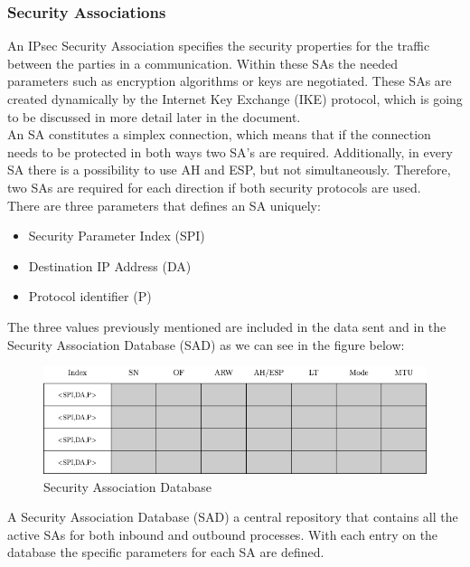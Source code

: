 \documentclass[11pt]{book}
\begin{document}
\subsubsection{ Security Associations}
An IPsec Security Association specifies the security properties for the traffic between the parties in a communication. Within these SAs the needed parameters such as encryption algorithms or keys are negotiated. These SAs are created dynamically by the Internet Key Exchange (IKE) protocol, which is going to be discussed in more detail later in the document.\\
An SA constitutes a simplex connection, which means that if the connection needs to be protected in both ways two SA's are required. Additionally, in every SA there is a possibility to use AH and ESP, but not simultaneously. Therefore, two SAs are required for each direction if both security protocols are used.\\
There are three parameters that defines an SA uniquely:
\begin{itemize}
\item Security Parameter Index (SPI)
\item Destination IP Address (DA)
\item Protocol identifier (P)
\end{itemize}
The three values previously mentioned are included in the data sent and in the Security Association Database (SAD) as we can see in the figure below:
\begin{figure}[H]
	\centering
	\includegraphics [scale=0.4] {sadb_table.png}
	\caption{Security Association Database}
\end{figure}
A Security Association Database (SAD) a central repository that contains all the active SAs for both inbound and outbound processes. With each entry on the database the specific parameters for each SA are defined.
\end{document}

